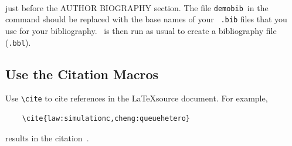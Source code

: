 \documentclass{scspaperproc}
\theoremstyle{scsthe}
\begin{document}
\begin{verbatim}


\end{verbatim}

just before the AUTHOR BIOGRAPHY section.  The file \texttt{demobib}\ in the \verb++ command should be replaced with the base names of your \BibTeX\ \texttt{.bib} files that you use for your bibliography.  \BibTeX\ is then run as usual to create a bibliography file (\texttt{.bbl}).


\subsection{Use the Citation Macros}

Use \verb+\cite+ to cite references in the \LaTeX source document. For example,

\begin{verbatim}
    \cite{law:simulationc,cheng:queuehetero}
\end{verbatim} %
    
results in the citation~\cite{law:simulationc,cheng:queuehetero}.


    
    
    
    
    
    
\end{document}
